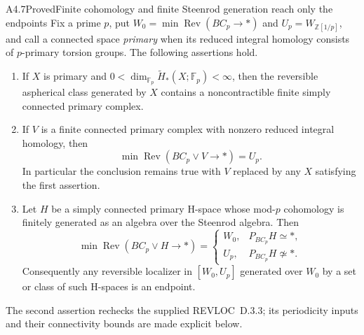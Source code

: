 \begin{claim}{A4.7}{Proved}{Finite cohomology and finite Steenrod generation reach only the endpoints}
\label{A47}
Fix a prime $p$, put
$W_0=\min\operatorname{Rev}(BC_p\to*)$ and
$U_p=W_{\mathbb Z[1/p]}$, and call a connected space \emph{primary}
when its reduced integral homology consists of $p$-primary torsion groups.
The following assertions hold.

\begin{enumerate}
\item If $X$ is primary and
$0<\dim_{\mathbb F_p}\widetilde H_*(X;\mathbb F_p)<\infty$,
then the reversible aspherical class generated by $X$ contains a
noncontractible finite simply connected primary complex.
\item If $V$ is a finite connected primary complex with nonzero
reduced integral homology, then
\[
          \min\operatorname{Rev}(BC_p\vee V\to*)=U_p.
          \tag{A4.7.1}
\]
In particular the conclusion remains true with $V$ replaced by
any $X$ satisfying the first assertion.
\item Let $H$ be a simply connected primary H-space whose mod-$p$
cohomology is finitely generated as an algebra over the Steenrod
algebra.  Then
\[
 \min\operatorname{Rev}(BC_p\vee H\to*)=
 \begin{cases}
  W_0,&P_{BC_p}H\simeq *,\\
  U_p,&P_{BC_p}H\not\simeq *.
 \end{cases}
 \tag{A4.7.2}
\]
Consequently any reversible localizer in $[W_0,U_p]$ generated
over $W_0$ by a set or class of such H-spaces is an endpoint.
\end{enumerate}
The second assertion rechecks the supplied REVLOC~D.3.3; its
periodicity inputs and their connectivity bounds are made explicit below.
\end{claim}
